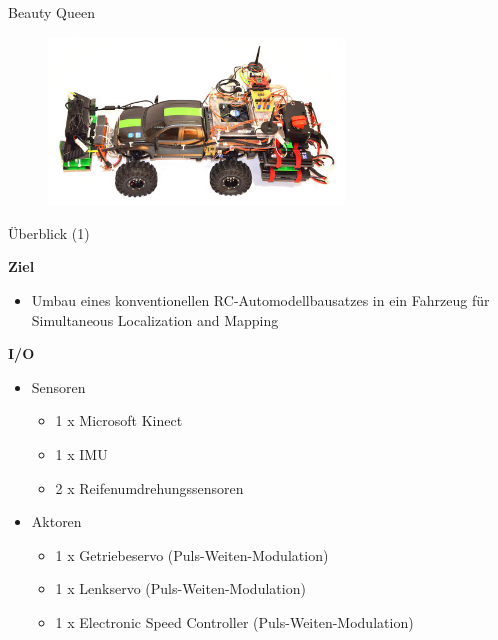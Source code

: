 \documentclass{beamer}
\begin{document}
\begin{frame}{Beauty Queen}
 \begin{figure}[H]
  \centering
  \includegraphics[width=0.7\textwidth]{./images/robot-beauty-queen.jpg}
 \end{figure}
\end{frame}
\begin{frame}{\"Uberblick (1)}
\begin{large}\textbf{Ziel}\end{large}
\begin{itemize}
	\item Umbau eines konventionellen RC-Automodellbausatzes in ein Fahrzeug f\"ur Simultaneous Localization and Mapping
\end{itemize}
\vspace{20px}
\begin{large}\textbf{I/O}\end{large}
\begin{itemize}
	\item Sensoren
	\begin{itemize}
		\item 1 x Microsoft Kinect
		\item 1 x IMU
		\item 2 x Reifenumdrehungssensoren
	\end{itemize}
	\item Aktoren
	\begin{itemize}
		\item 1 x Getriebeservo (Puls-Weiten-Modulation)
		\item 1 x Lenkservo (Puls-Weiten-Modulation)
		\item 1 x Electronic Speed Controller (Puls-Weiten-Modulation)
	\end{itemize}
\end{itemize}	
\end{frame}
\end{document}
